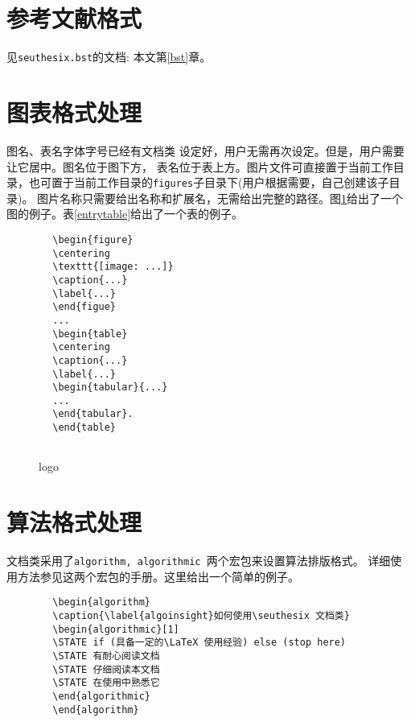 \documentclass[figurelist,tablelist,algorithmlist,nomlist,masters]{seuthesix}
\begin{document}
	\section{参考文献格式}
	见\verb+seuthesix.bst+的文档: 本文第\ref{bst}章。
	
	\section{图表格式处理}
	图名、表名字体字号已经有文档类 设定好，用户无需再次设定。但是，用户需要让它居中。图名位于图下方，
	表名位于表上方。图片文件可直接置于当前工作目录，也可置于当前工作目录的\texttt{figures}子目录下(用户根据需要，自己创建该子目录)。
	图片名称只需要给出名称和扩展名，无需给出完整的路径。图\ref{logo}给出了一个图的例子。表\ref{entrytable}给出了一个表的例子。
	{\color{magenta}
		\begin{verbatim}
		\begin{figure}
		\centering
		\texttt{[image: ...]}
		\caption{...}
		\label{...}
		\end{figue}
		...
		\begin{table}
		\centering
		\caption{...}
		\label{...}
		\begin{tabular}{...}
		...
		\end{tabular}.
		\end{table}
		
		\end{verbatim}
	}
	
	\begin{figure}
		\centering
		\caption{\seuthesix logo\label{logo}}
		\chuhao \seuthesix
	\end{figure}
	
	\section{算法格式处理}
	\seuthesix 文档类采用了\texttt{algorithm, algorithmic }两个宏包来设置算法排版格式。
	详细使用方法参见这两个宏包的手册。这里给出一个简单的例子。
	{\color{magenta}
		\begin{verbatim}
		\begin{algorithm}
		\caption{\label{algoinsight}如何使用\seuthesix 文档类}
		\begin{algorithmic}[1]
		\STATE if (具备一定的\LaTeX 使用经验) else (stop here)
		\STATE 有耐心阅读文档
		\STATE 仔细阅读本文档
		\STATE 在使用中熟悉它
		\end{algorithmic}
		\end{algorithm}
		\end{verbatim}
	}
	
\end{document}

